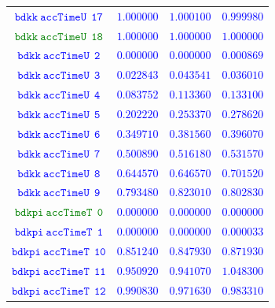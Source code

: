 \documentclass[10pt,a4paper]{article}
\begin{document}
\begin{table}[h!]
{\begin{tabular}{cccc}
\textcolor{blue}{$\mathtt{bdkk~accTimeU~~17}$} & \textcolor{blue}{$1.000000$}& \textcolor{blue}{$1.000100$}& \textcolor{blue}{$0.999980$}\\
\textcolor{Green}{$\mathtt{bdkk~accTimeU~~18}$} & \textcolor{blue}{$1.000000$}& \textcolor{blue}{$1.000000$}& \textcolor{blue}{$1.000000$}\\
\textcolor{blue}{$\mathtt{bdkk~accTimeU~~2}$} & \textcolor{blue}{$0.000000$}& \textcolor{blue}{$0.000000$}& \textcolor{blue}{$0.000869$}\\
\textcolor{blue}{$\mathtt{bdkk~accTimeU~~3}$} & \textcolor{blue}{$0.022843$}& \textcolor{blue}{$0.043541$}& \textcolor{blue}{$0.036010$}\\
\textcolor{blue}{$\mathtt{bdkk~accTimeU~~4}$} & \textcolor{blue}{$0.083752$}& \textcolor{blue}{$0.113360$}& \textcolor{blue}{$0.133100$}\\
\textcolor{blue}{$\mathtt{bdkk~accTimeU~~5}$} & \textcolor{blue}{$0.202220$}& \textcolor{blue}{$0.253370$}& \textcolor{blue}{$0.278620$}\\
\textcolor{blue}{$\mathtt{bdkk~accTimeU~~6}$} & \textcolor{blue}{$0.349710$}& \textcolor{blue}{$0.381560$}& \textcolor{blue}{$0.396070$}\\
\textcolor{blue}{$\mathtt{bdkk~accTimeU~~7}$} & \textcolor{blue}{$0.500890$}& \textcolor{blue}{$0.516180$}& \textcolor{blue}{$0.531570$}\\
\textcolor{blue}{$\mathtt{bdkk~accTimeU~~8}$} & \textcolor{blue}{$0.644570$}& \textcolor{blue}{$0.646570$}& \textcolor{blue}{$0.701520$}\\
\textcolor{blue}{$\mathtt{bdkk~accTimeU~~9}$} & \textcolor{blue}{$0.793480$}& \textcolor{blue}{$0.823010$}& \textcolor{blue}{$0.802830$}\\
\textcolor{Green}{$\mathtt{bdkpi~accTimeT~~0}$} & \textcolor{blue}{$0.000000$}& \textcolor{blue}{$0.000000$}& \textcolor{blue}{$0.000000$}\\
\textcolor{blue}{$\mathtt{bdkpi~accTimeT~~1}$} & \textcolor{blue}{$0.000000$}& \textcolor{blue}{$0.000000$}& \textcolor{blue}{$0.000033$}\\
\textcolor{blue}{$\mathtt{bdkpi~accTimeT~~10}$} & \textcolor{blue}{$0.851240$}& \textcolor{blue}{$0.847930$}& \textcolor{blue}{$0.871930$}\\
\textcolor{blue}{$\mathtt{bdkpi~accTimeT~~11}$} & \textcolor{blue}{$0.950920$}& \textcolor{blue}{$0.941070$}& \textcolor{blue}{$1.048300$}\\
\textcolor{blue}{$\mathtt{bdkpi~accTimeT~~12}$} & \textcolor{blue}{$0.990830$}& \textcolor{blue}{$0.971630$}& \textcolor{blue}{$0.983310$}\\

\end{tabular}}
\end{table}
\end{document}
